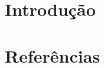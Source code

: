 \documentclass[a4paper,12pt]{report}
\begin{document}







\chapter{Introdução}\label{chap:intro}





\chapter{Referências}\label{chap:refs}


\appendix
% 
\end{document}
